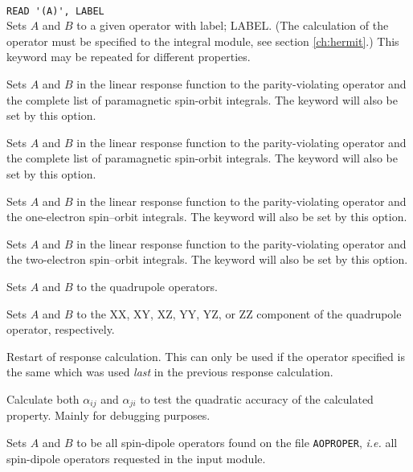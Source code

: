 \begin{description}
\item{}\\
\verb|READ '(A)', LABEL|\\
Sets $A$ and $B$ to a given operator with label; LABEL.
(The calculation of the operator must be specified to the integral
module, see section \ref{ch:hermit}.)
This keyword may be repeated for different properties.

\item{} Sets $A$ and $B$ in the linear response function
  to the parity-violating operator and the complete list of
  paramagnetic spin-orbit integrals. The  keyword will
  also be set by this option.

\item{} Sets $A$ and $B$ in the linear response function
  to the parity-violating operator and the complete list of
  paramagnetic spin-orbit integrals. The  keyword will
  also be set by this option.

\item{} Sets $A$ and $B$ in the linear response function
  to the parity-violating operator and the one-electron spin--orbit
  integrals. The  keyword will
  also be set by this option.

\item{} Sets $A$ and $B$ in the linear response function
  to the parity-violating operator and the two-electron spin--orbit
  integrals. The  keyword will
  also be set by this option.

\item{}
Sets $A$ and $B$ to the quadrupole operators.

\item{}
Sets $A$ and $B$ to the XX, XY, XZ, YY, YZ, or ZZ component of the
quadrupole operator, respectively.

\item{}
Restart of response calculation. This
can only be used if the  
operator specified is the same which was used \textit{last} in the previous
response calculation.

\item{} Calculate both $\alpha_{ij}$ and $\alpha_{ji}$ to
  test the quadratic accuracy of the calculated property. Mainly for
  debugging purposes.

\item{} Sets $A$ and $B$ to be all spin-dipole operators
  found on the file \verb|AOPROPER|, {\it i.e.\/} all spin-dipole
  operators requested in the  input module.


\end{description}
